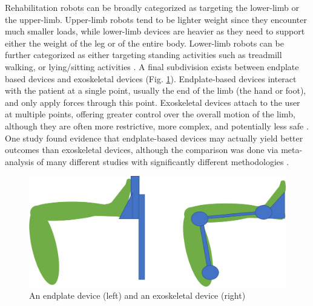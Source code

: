 \documentclass[12pt]{report}
\begin{document}
	Rehabilitation robots can be broadly categorized as targeting the lower-limb or the upper-limb. Upper-limb robots tend to be lighter weight since they encounter much smaller loads, while lower-limb devices are heavier as they need to support either the weight of the leg or of the entire body. Lower-limb robots can be further categorized as either targeting standing activities such as treadmill walking, or lying/sitting activities \cite{Calabro2016}. A final subdivision exists between endplate based devices and exoskeletal devices (Fig. \ref{fig:end_exo}). Endplate-based devices interact with the patient at a single point, usually the end of the limb (the hand or foot), and only apply forces through this point. Exoskeletal devices attach to the user at multiple points, offering greater control over the overall motion of the limb, although they are often more restrictive, more complex, and potentially less safe \cite{Chang2013}. One study found evidence that endplate-based devices may actually yield better outcomes than exoskeletal devices, although the comparison was done via meta-analysis of many different studies with significantly different methodologies \cite{Mehrholz2012} . 
	
	
	\begin{figure}[h] 
		\centering
		\includegraphics[width=0.8\linewidth]{endplate_exoskeleton}
		\caption{An endplate device (left) and an exoskeletal device (right)}
		\label{fig:end_exo}
	\end{figure}
\end{document}
